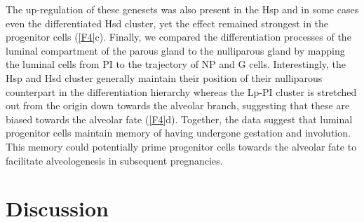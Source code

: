 \documentclass[titlepage, 12pt, oneside]{amsart}
\begin{document}
The up-regulation of these genesets was also present in the Hsp and in some cases even the differentiated Hsd cluster, yet the effect remained strongest in the progenitor cells (\autoref{F4}c).
Finally, we compared the differentiation processes of the luminal compartment of the parous gland to the nulliparous gland by mapping the luminal cells from PI to the trajectory of NP and G cells.
Interestingly, the Hsp and Hsd cluster generally maintain their position of their nulliparous counterpart in the differentiation hierarchy whereas the Lp-PI cluster is stretched out from the origin down towards the alveolar branch, suggesting that these are biased towards the alveolar fate (\autoref{F4}d).
Together, the data suggest that luminal progenitor cells maintain memory of having undergone gestation and involution.
This memory could potentially prime progenitor cells towards the alveolar fate to facilitate alveologenesis in subsequent pregnancies.

\section{Discussion}
\end{document}
